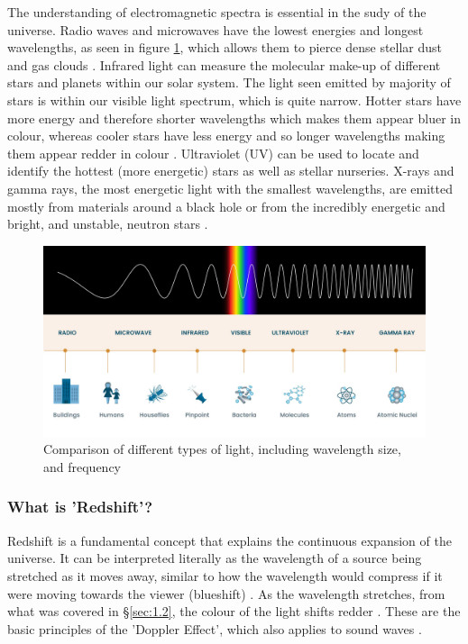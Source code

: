 \documentclass[12pt]{article}
\begin{document}
The understanding of electromagnetic spectra is essential in the sudy of the universe. Radio waves and microwaves have the lowest energies and longest wavelengths, as seen in
figure \ref{fig:wavelength}, which allows them to pierce dense stellar dust and gas clouds
\cite{hubblespectra}.
Infrared light can measure the molecular make-up of different stars and planets within our solar system.
The light seen emitted by majority of stars is within our visible light spectrum, which is quite narrow. Hotter stars have more energy and therefore shorter wavelengths
which makes them appear bluer in colour, whereas cooler stars have less energy and so longer wavelengths making them appear redder in colour
\cite{hubblespectra}.
Ultraviolet (UV) can be used to locate and identify the hottest (more energetic) stars as well as stellar nurseries.
X-rays and gamma rays, the most energetic light with the smallest wavelengths, are emitted mostly from materials around a black hole or from
the incredibly energetic and bright, and unstable, neutron stars
\cite{hubblespectra}.

\begin{figure}[H]
    \centering
    \includegraphics[width=15cm]{light waves.jpg}
    \caption{\centering \footnotesize{Comparison of different types of light, including wavelength size, and frequency \protect\cite{hubblespectra}}}
    \label{fig:wavelength}
\end{figure}

\subsubsection{What is 'Redshift'?} \label{sec:1.2.1}

Redshift is a fundamental concept that explains the continuous expansion of the universe.
It can be interpreted literally as the wavelength of a source being stretched as it moves away, similar to how the wavelength would compress if it were moving towards the viewer (blueshift)
\cite{esaredshift,earthskyredshift}.
As the wavelength stretches, from what was covered in §\ref{sec:1.2}, the colour of the light shifts redder
\cite{esaredshift}.
These are the basic principles of the 'Doppler Effect', which also applies to sound waves
\cite{esaredshift,lcoredshift,britredshift,earthskyredshift}.
\end{document}
